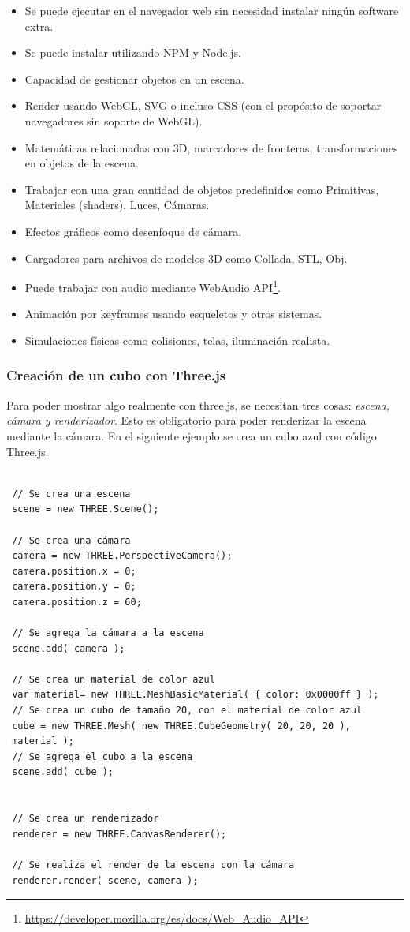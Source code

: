 \begin{itemize}
    \item Se puede ejecutar en el navegador web sin necesidad instalar ningún software extra.
    \item Se puede instalar utilizando NPM y Node.js.
    \item Capacidad de gestionar objetos en un escena.
    \item Render usando WebGL, SVG o incluso CSS (con el propósito de soportar navegadores sin soporte de WebGL).
    \item Matemáticas relacionadas con 3D, marcadores de fronteras, transformaciones en objetos de la escena.
    \item Trabajar con una gran cantidad de objetos predefinidos como Primitivas, Materiales (shaders), Luces, Cámaras.
    \item Efectos gráficos como desenfoque de cámara.
    \item Cargadores para archivos de modelos 3D como Collada, STL, Obj.
    \item Puede trabajar con audio mediante WebAudio API\footnote{\url{https://developer.mozilla.org/es/docs/Web_Audio_API}}.
    \item Animación por keyframes usando esqueletos y otros sistemas.
    \item Simulaciones físicas como colisiones, telas, iluminación realista.
\end{itemize} 

\subsubsection{Creación de un cubo con Three.js}

Para poder mostrar algo realmente  con three.js, se necesitan tres cosas: \textit{escena, cámara y renderizador}. Esto es obligatorio para poder renderizar la escena mediante la cámara. En el siguiente ejemplo se crea un cubo azul con código Three.js. 

\begin{verbatim} 

 // Se crea una escena
 scene = new THREE.Scene();

 // Se crea una cámara
 camera = new THREE.PerspectiveCamera();
 camera.position.x = 0;
 camera.position.y = 0;
 camera.position.z = 60;
	
 // Se agrega la cámara a la escena		
 scene.add( camera );

 // Se crea un material de color azul			
 var material= new THREE.MeshBasicMaterial( { color: 0x0000ff } );
 // Se crea un cubo de tamaño 20, con el material de color azul 
 cube = new THREE.Mesh( new THREE.CubeGeometry( 20, 20, 20 ), 
 material );
 // Se agrega el cubo a la escena
 scene.add( cube );


 // Se crea un renderizador
 renderer = new THREE.CanvasRenderer();

 // Se realiza el render de la escena con la cámara
 renderer.render( scene, camera );

\end{verbatim}


